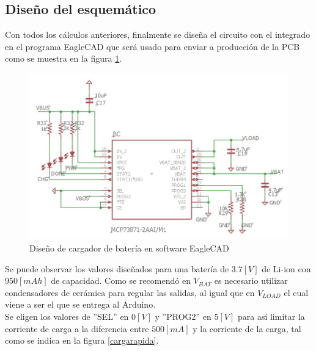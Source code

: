 \subsection{Diseño del esquemático}

Con todos los cálculos anteriores, finalmente se diseña el circuito con el integrado en el programa EagleCAD que será usado para enviar a producción de la PCB como se muestra en la figura \ref{esquematico22}.

\begin{figure}[H]
\centering
\includegraphics[scale=0.7]{figuras/bateria/esquematico.jpg}
\caption{Diseño de cargador de batería en software EagleCAD}
\label{esquematico22}
\end{figure}

Se puede observar los valores diseñados para una batería de $3.7[V]$ de Li-ion con $950[mAh]$ de capacidad. Como se recomendó en $V_{BAT}$ es necesario utilizar condensadores de cerámica para regular las salidas, al igual que en $V_{LOAD}$ el cual viene a ser el que se entrega al Arduino.\\
Se eligen los valores de ''SEL'' en $0[V]$ y ''PROG2'' en $5[V]$ para así limitar la corriente de carga a la diferencia entre $500[mA]$ y la corriente de la carga, tal como se indica en la figura \ref{cargarapida}.